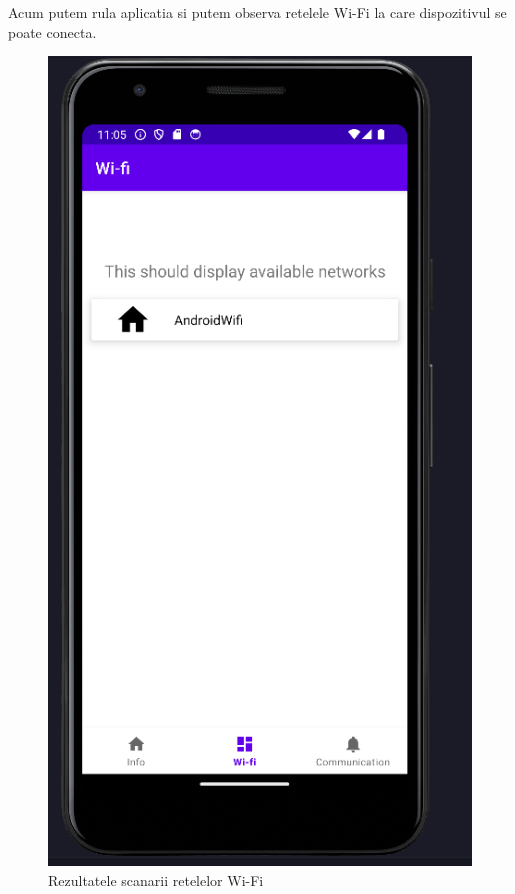 Acum putem rula aplicatia si putem observa retelele Wi-Fi la care dispozitivul se poate conecta.

\begin{figure}[H]
    \centering
    \includegraphics[width=0.7\linewidth]{figs/wifi_scan_res.png}
    \caption{Rezultatele scanarii retelelor Wi-Fi}
    \label{fig:wifi_scan_res}
\end{figure}